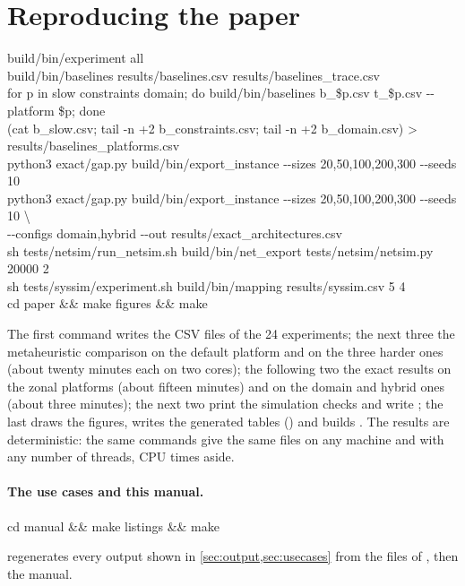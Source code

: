 \section{Reproducing the paper}
\label{sec:reproduce}

\begin{shell}
build/bin/experiment all\\
build/bin/baselines results/baselines.csv results/baselines\_trace.csv\\
for p in slow constraints domain; do build/bin/baselines b\_\$p.csv t\_\$p.csv -{}-platform \$p; done\\
(cat b\_slow.csv; tail -n +2 b\_constraints.csv; tail -n +2 b\_domain.csv) > results/baselines\_platforms.csv\\
python3 exact/gap.py build/bin/export\_instance -{}-sizes 20,50,100,200,300 -{}-seeds 10\\
python3 exact/gap.py build/bin/export\_instance -{}-sizes 20,50,100,200,300 -{}-seeds 10 \textbackslash\\
\quad -{}-configs domain,hybrid -{}-out results/exact\_architectures.csv\\
sh tests/netsim/run\_netsim.sh build/bin/net\_export tests/netsim/netsim.py 20000 2\\
sh tests/syssim/experiment.sh build/bin/mapping results/syssim.csv 5 4\\
cd paper \&\& make figures \&\& make
\end{shell}
The first command writes the CSV files of the 24 experiments; the next
three the metaheuristic comparison on the default platform and on the
three harder ones (about twenty minutes each on two cores); the
following two the exact results on the zonal platforms (about fifteen
minutes) and on the domain and hybrid ones (about three minutes); the
next two print the simulation checks and write ; the last
draws the figures, writes the generated tables
() and builds . The results
are deterministic: the same commands give the same files on any machine
and with any number of threads, CPU times aside.

\paragraph{The use cases and this manual.}
\begin{shell}
cd manual \&\& make listings \&\& make
\end{shell}
regenerates every output shown in \cref{sec:output,sec:usecases} from the
files of , then the manual.
